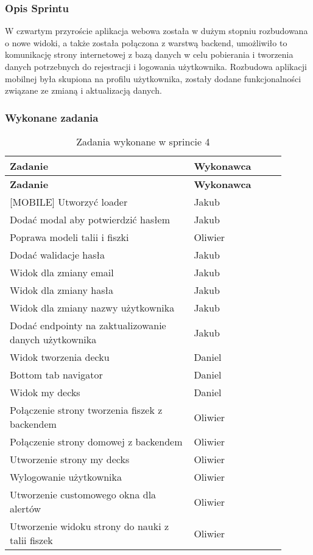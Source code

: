 \subsubsection{Opis Sprintu}
W czwartym przyroście aplikacja webowa została w dużym stopniu rozbudowana o nowe widoki, a także została połączona z warstwą backend, umożliwiło to komunikację strony internetowej z bazą danych w celu pobierania i tworzenia danych potrzebnych do rejestracji i logowania użytkownika. Rozbudowa aplikacji mobilnej  była skupiona na profilu użytkownika, zostały dodane funkcjonalności związane ze zmianą i aktualizacją danych.

\subsubsection{Wykonane zadania}

\begin{longtable}{|p{0.6\linewidth}|p{0.3\linewidth}|}
\hline
\textbf{Zadanie} & \textbf{Wykonawca} \\
\hline
\endfirsthead

\hline
\textbf{Zadanie} & \textbf{Wykonawca} \\
\hline
\endhead

\hline
\endfoot

\hline
\caption{Zadania wykonane w sprincie 4}
\endlastfoot

[MOBILE] Utworzyć loader & Jakub \\
\hline
[MOBILE] Dodać modal aby potwierdzić hasłem & Jakub \\
\hline
[BACKEND] Poprawa modeli talii i fiszki & Oliwier \\
\hline
[MOBILE] Dodać walidacje hasła & Jakub \\
\hline
[MOBILE] Widok dla zmiany email & Jakub \\
\hline
[MOBILE] Widok dla zmiany hasła & Jakub \\
\hline
[MOBILE] Widok dla zmiany nazwy użytkownika & Jakub \\
\hline
[BACKEND] Dodać endpointy na zaktualizowanie danych użytkownika & Jakub \\
\hline
[MOBILE] Widok tworzenia decku & Daniel \\
\hline
[MOBILE] Bottom tab navigator & Daniel \\
\hline
[MOBILE] Widok my decks & Daniel \\
\hline
[WEB] Połączenie strony tworzenia fiszek z backendem & Oliwier \\
\hline
[WEB] Połączenie strony domowej z backendem & Oliwier \\
\hline
[WEB] Utworzenie strony my decks & Oliwier \\
\hline
[WEB] Wylogowanie użytkownika & Oliwier \\
\hline
[WEB] Utworzenie customowego okna dla alertów & Oliwier \\
\hline
[WEB] Utworzenie widoku strony do nauki z talii fiszek & Oliwier \\
\hline

\end{longtable}

